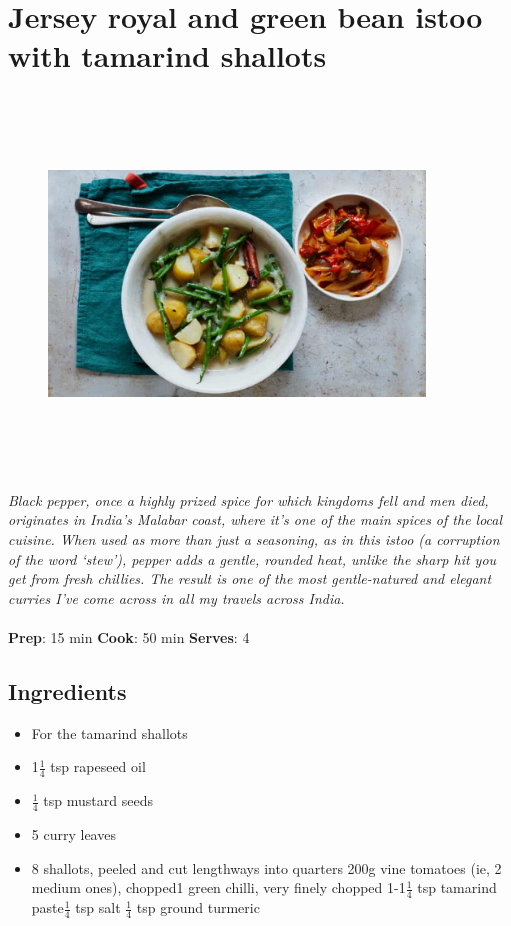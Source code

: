 \documentclass{book}
\begin{document}
\section{Jersey royal and green bean istoo with tamarind shallots}
\begin{figure}
\centering\includegraphics[width=10cm,height=10cm,keepaspectratio]{Recipe_Pictures/Jersey_royal_and_green_bean_istoo_with_tamarind_shallots.png}
\end{figure}
\emph{Black pepper, once a highly prized spice for which kingdoms fell and men died, originates in India’s Malabar coast, where it’s one of the main spices of the local cuisine. When used as more than just a seasoning, as in this istoo (a corruption of the word ‘stew’), pepper adds a gentle, rounded heat, unlike the sharp hit you get from fresh chillies. The result is one of the most gentle-natured and elegant curries I’ve come across in all my travels across India.}\\\\ 
\textbf{Prep}: 15 min
\textbf{Cook}: 50 min
\textbf{Serves}: 4
\subsection*{Ingredients}
\begin{itemize}
\item For the tamarind shallots 
\item 1$\frac{1}{4}$ tsp rapeseed oil 
\item $\frac{1}{4}$ tsp mustard seeds
\item 5 curry leaves 
\item 8 shallots, peeled and cut lengthways into quarters 200g vine tomatoes (ie, 2 medium ones), chopped1 green chilli, very finely chopped 1-1$\frac{1}{4}$ tsp tamarind paste$\frac{1}{4}$ tsp salt $\frac{1}{4}$ tsp ground turmeric
\end{itemize}
\end{document}
